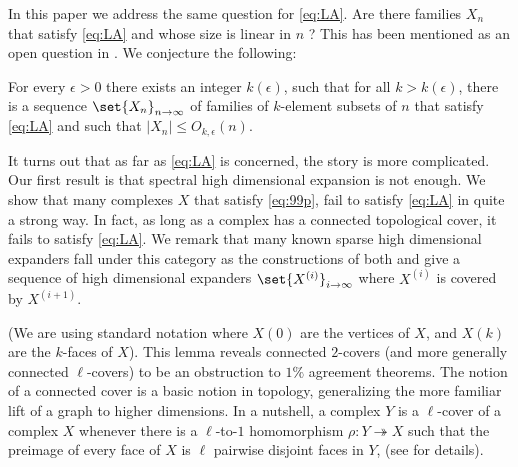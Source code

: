 \documentclass{article}[11pt]
\begin{document}
In this paper we address the same question for \eqref{eq:LA}. Are there families $X_n$ that satisfy \eqref{eq:LA} and whose size is linear in $n$ ? This has been mentioned as an open question in \cite{DinurK2017}. We conjecture the following: 
\begin{conjecture}\label{conj:1}
    For every $\epsilon>0$ there exists an integer $k(\epsilon)$, such that for all $k>k(\epsilon)$, there is a sequence $\set{X_n}_{n\to\infty}$ of families of $k$-element subsets of $n$ that satisfy \eqref{eq:LA} and such that $|X_n| \leq O_{k,\epsilon}(n)$.
\end{conjecture}
%
It turns out that as far as \eqref{eq:LA} is concerned, the story is more complicated. 
%
Our first result is that spectral high dimensional expansion is not enough.  
We show that many complexes $X$ that satisfy \eqref{eq:99p}, fail to satisfy \eqref{eq:LA} in quite a strong way. In fact, as long as a complex has a connected topological cover, it fails to satisfy \eqref{eq:LA}. We remark that many known sparse high dimensional expanders fall under this category as the constructions of both \cite{LubotzkySV2005a} and \cite{KaufmanO181} give a sequence of high dimensional expanders $\set{X^{(i)}}_{i\to \infty}$ where $X^{(i)}$ is covered by $X^{(i+1)}$. 
\begin{lemma}
\end{lemma}
(We are using standard notation where $X(0)$ are the vertices of $X$, and $X(k)$ are the $k$-faces of $X$). This lemma reveals connected $2$-covers (and more generally connected $\ell$-covers) to be an obstruction to $1\%$ agreement theorems.  The notion of a connected cover is a basic notion in topology, generalizing the more familiar lift of a graph to higher dimensions. In a nutshell, a complex $Y$ is a $\ell$-cover of a complex $X$ whenever there is a $\ell$-to-$1$ homomorphism $\rho: Y \twoheadrightarrow X$ such that the preimage of every face of $X$ is $\ell$ pairwise disjoint faces in $Y$,  (see  for details). 
\end{document}

